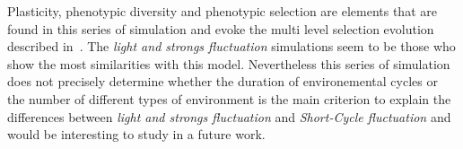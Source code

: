 Plasticity, phenotypic diversity and phenotypic selection are elements that are found in this series of simulation and evoke the  multi level selection evolution described in~\citep{jablonka2014evolution}. The \emph{light and strongs fluctuation} simulations seem to be those who show the most similarities with this model. Nevertheless this series of simulation does not precisely determine whether the duration of environemental cycles or the number of different types of environment is the main criterion to explain the differences between \emph{light and strongs fluctuation} and \emph{Short-Cycle fluctuation} and would be interesting to study in a future work.